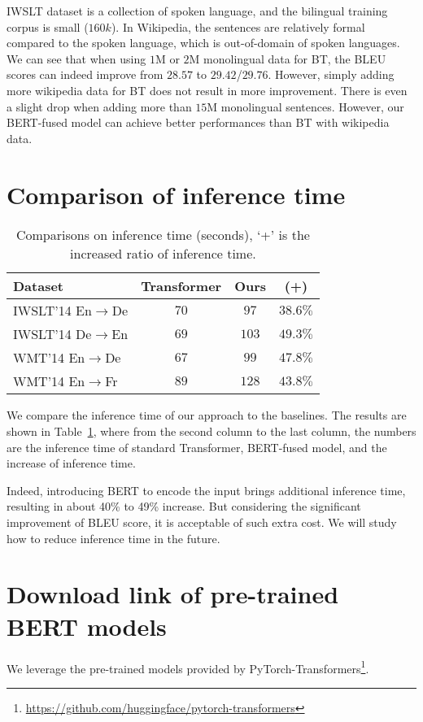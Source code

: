 \documentclass{article} \usepackage{iclr2020_conference,times}
\begin{document}
IWSLT dataset is a collection of spoken language, and the bilingual training corpus is small ($160k$). In Wikipedia, the sentences are relatively formal compared to the spoken language, which is  out-of-domain of spoken languages. We can see that when using $1$M or $2$M monolingual data for BT, the BLEU scores can indeed improve from $28.57$ to $29.42$/$29.76$. However, simply adding more wikipedia data for BT does not result in more improvement. There is even a slight drop when adding more than $15$M monolingual sentences. However, our BERT-fused model can achieve better performances than BT with wikipedia data.







\section{Comparison of inference time}\label{sec:infer_time}
\begin{table}[!htbp]
\centering
\caption{Comparisons on inference time (seconds), `+' is the increased ratio of inference time.}
\begin{tabular}{lccc}
\toprule
Dataset & Transformer & Ours & (+) \\
\midrule
IWSLT'14 En$\to$De & $70$ & $97$ & $38.6\%$ \\
IWSLT'14 De$\to$En & $69$ & $103$ & $49.3\%$ \\
WMT'14 En$\to$De   & $67$ & $99$  & $47.8\%$ \\
WMT'14 En$\to$Fr   & $89$ & $128$ & $43.8\%$ \\
\bottomrule
\end{tabular}
\label{tab:statistics_compare_bert_and_nmt}
\end{table}
We compare the inference time of our approach to the baselines. The results are shown in Table~\ref{tab:statistics_compare_bert_and_nmt},
where from the second column to the last column, the numbers are the inference time of standard Transformer, BERT-fused model, and the increase of inference time.

Indeed, introducing BERT to encode the input brings additional inference time, resulting in about 40\% to 49\% increase. But considering the significant improvement of BLEU score, it is acceptable of such extra cost. We will study how to reduce inference time in the future. 

\section{Download link of pre-trained BERT models}\label{app:pretrained_bert_models}
\label{app:model_download}
We leverage the pre-trained models provided by PyTorch-Transformers\footnote{\url{https://github.com/huggingface/pytorch-transformers}}.
\end{document}
